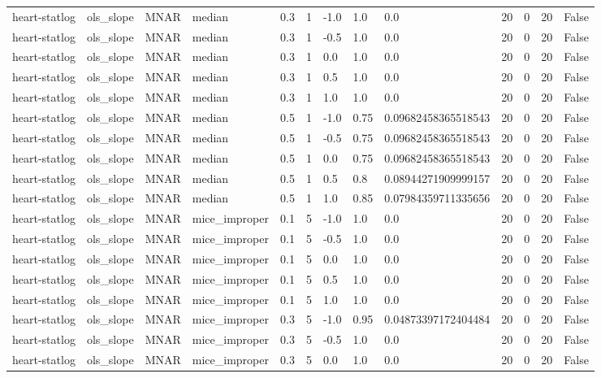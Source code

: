 \begin{tabular}{lllllllllllll}
heart-statlog & ols\_slope & MNAR & median & 0.3 & 1 & -1.0 & 1.0 & 0.0 & 20 & 0 & 20 & False \\
heart-statlog & ols\_slope & MNAR & median & 0.3 & 1 & -0.5 & 1.0 & 0.0 & 20 & 0 & 20 & False \\
heart-statlog & ols\_slope & MNAR & median & 0.3 & 1 & 0.0 & 1.0 & 0.0 & 20 & 0 & 20 & False \\
heart-statlog & ols\_slope & MNAR & median & 0.3 & 1 & 0.5 & 1.0 & 0.0 & 20 & 0 & 20 & False \\
heart-statlog & ols\_slope & MNAR & median & 0.3 & 1 & 1.0 & 1.0 & 0.0 & 20 & 0 & 20 & False \\
heart-statlog & ols\_slope & MNAR & median & 0.5 & 1 & -1.0 & 0.75 & 0.09682458365518543 & 20 & 0 & 20 & False \\
heart-statlog & ols\_slope & MNAR & median & 0.5 & 1 & -0.5 & 0.75 & 0.09682458365518543 & 20 & 0 & 20 & False \\
heart-statlog & ols\_slope & MNAR & median & 0.5 & 1 & 0.0 & 0.75 & 0.09682458365518543 & 20 & 0 & 20 & False \\
heart-statlog & ols\_slope & MNAR & median & 0.5 & 1 & 0.5 & 0.8 & 0.08944271909999157 & 20 & 0 & 20 & False \\
heart-statlog & ols\_slope & MNAR & median & 0.5 & 1 & 1.0 & 0.85 & 0.07984359711335656 & 20 & 0 & 20 & False \\
heart-statlog & ols\_slope & MNAR & mice\_improper & 0.1 & 5 & -1.0 & 1.0 & 0.0 & 20 & 0 & 20 & False \\
heart-statlog & ols\_slope & MNAR & mice\_improper & 0.1 & 5 & -0.5 & 1.0 & 0.0 & 20 & 0 & 20 & False \\
heart-statlog & ols\_slope & MNAR & mice\_improper & 0.1 & 5 & 0.0 & 1.0 & 0.0 & 20 & 0 & 20 & False \\
heart-statlog & ols\_slope & MNAR & mice\_improper & 0.1 & 5 & 0.5 & 1.0 & 0.0 & 20 & 0 & 20 & False \\
heart-statlog & ols\_slope & MNAR & mice\_improper & 0.1 & 5 & 1.0 & 1.0 & 0.0 & 20 & 0 & 20 & False \\
heart-statlog & ols\_slope & MNAR & mice\_improper & 0.3 & 5 & -1.0 & 0.95 & 0.04873397172404484 & 20 & 0 & 20 & False \\
heart-statlog & ols\_slope & MNAR & mice\_improper & 0.3 & 5 & -0.5 & 1.0 & 0.0 & 20 & 0 & 20 & False \\
heart-statlog & ols\_slope & MNAR & mice\_improper & 0.3 & 5 & 0.0 & 1.0 & 0.0 & 20 & 0 & 20 & False \\

\end{tabular}
